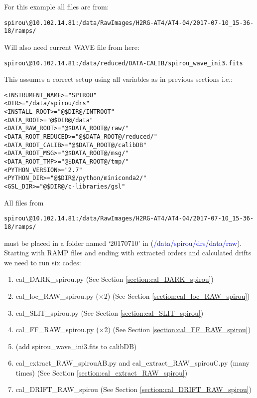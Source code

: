 For this example all files are from:
\begin{lstlisting}[style=bashstyle]
spirou\@10.102.14.81:/data/RawImages/H2RG-AT4/AT4-04/2017-07-10_15-36-18/ramps/
\end{lstlisting}  

Will also need current WAVE file from here:
\begin{lstlisting}[style=bashstyle]
spirou\@10.102.14.81:/data/reduced/DATA-CALIB/spirou_wave_ini3.fits
\end{lstlisting}  

\noindent This assumes a correct setup using all variables as in previous sections i.e.:
\begin{lstlisting}[style=text]
<INSTRUMENT_NAME>="SPIROU"
<DIR>="/data/spirou/drs"
<INSTALL_ROOT>="@$DIR@/INTROOT"
<DATA_ROOT>="@$DIR@/data"
<DATA_RAW_ROOT>="@$DATA_ROOT@/raw/"
<DATA_ROOT_REDUCED>="@$DATA_ROOT@/reduced/"
<DATA_ROOT_CALIB>="@$DATA_ROOT@/calibDB"
<DATA_ROOT_MSG>="@$DATA_ROOT@/msg/"
<DATA_ROOT_TMP>="@$DATA_ROOT@/tmp/"
<PYTHON_VERSION>="2.7"
<PYTHON_DIR>="@$DIR@/python/miniconda2/"
<GSL_DIR>="@$DIR@/c-libraries/gsl"
\end{lstlisting}

\noindent All files from 
\begin{lstlisting}[style=bashstyle]
spirou\@10.102.14.81:/data/RawImages/H2RG-AT4/AT4-04/2017-07-10_15-36-18/ramps/
\end{lstlisting}  
\noindent must be placed in a folder named `20170710' in  (\textcolor{blue}{/data/spirou/drs/data/raw}). \\

\noindent Starting with RAMP files and ending with extracted orders and calculated drifts we need to run six codes:
\begin{enumerate}
\item cal\_DARK\_spirou.py \hfill (See Section \ref{section:cal_DARK_spirou})
\item cal\_loc\_RAW\_spirou.py ($\times$2) \hfill (See Section \ref{section:cal_loc_RAW_spirou})
\item cal\_SLIT\_spirou.py \hfill (See Section \ref{section:cal_SLIT_spirou})
\item cal\_FF\_RAW\_spirou.py ($\times$2) \hfill (See Section \ref{section:cal_FF_RAW_spirou})
\item (add spirou\_wave\_ini3.fits to calibDB) 
\item cal\_extract\_RAW\_spirouAB.py and cal\_extract\_RAW\_spirouC.py (many times) \hfill (See Section \ref{section:cal_extract_RAW_spirou})
\item cal\_DRIFT\_RAW\_spirou \hfill (See Section \ref{section:cal_DRIFT_RAW_spirou})
\end{enumerate}

